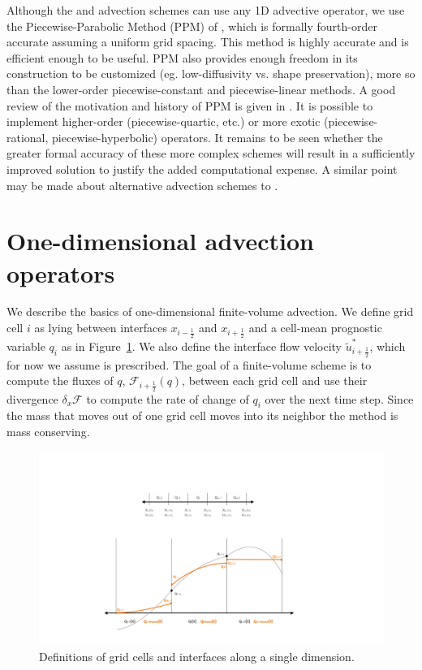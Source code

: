 \documentclass[10pt,letterpaper,margin=1in]{memoir}
\newcommand{\half}{\frac{1}{2}}
\begin{document}
Although the \citet{LR96} and \citet{PL07} advection schemes can use any 1D advective operator, we use the Piecewise-Parabolic Method (PPM) of \citet{CW84}, which is formally fourth-order accurate assuming a uniform grid spacing. This method is highly accurate and is efficient enough to be useful. PPM also provides enough freedom in its construction to be customized (eg. low-diffusivity vs. shape preservation), more so than the lower-order piecewise-constant \citet{Godunov1959} and piecewise-linear \citet{VanLeer1977} methods. A good review of the motivation and history of PPM is given in \citet{Woodward2007}. It is possible to implement higher-order (piecewise-quartic, etc.) or more exotic (piecewise-rational, piecewise-hyperbolic) operators. It remains to be seen whether the greater formal accuracy of these more complex schemes will result in a sufficiently improved solution to justify the added computational expense. A similar point may be made about alternative advection schemes to \citet{LR96}.

\section{One-dimensional advection operators} \label{sec:advection1d}

We describe the basics of one-dimensional finite-volume advection. We define grid cell $i$ as lying between interfaces $x_{i-\half}$ and $x_{i+\half}$ and a cell-mean prognostic variable $q_i$ as in Figure~\ref{fig:gridmetrics1d}. We also define the interface flow velocity $\widetilde{u}^*_{i+\half}$, which for now we assume is prescribed. The goal of a finite-volume scheme is to compute the fluxes of $q$, $\mathcal{F}_{i+\half}(q)$, between each grid cell and use their divergence $\delta_x \mathcal{F}$ to compute the rate of change of $q_i$ over the next time step. Since the mass that moves out of one grid cell moves into its neighbor the method is mass conserving.

\begin{figure}[tbp]
   \centering
   \includegraphics[scale=0.5]{gridmetrics1D.pdf} %
   \caption{Definitions of grid cells and interfaces along a single dimension. }
   \label{fig:gridmetrics1d}
\end{figure}
\end{document}
